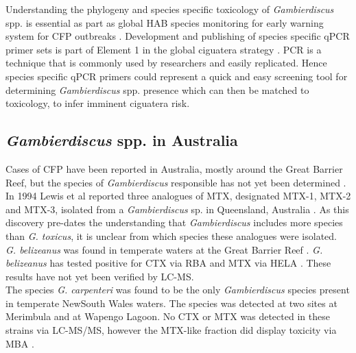 \documentclass[12pt]{article}
\begin{document}
Understanding the phylogeny and species specific toxicology of \emph{Gambierdiscus} spp. is essential as part as global HAB species monitoring for early warning system for CFP outbreaks \cite{berdalet2012global}. Development and publishing of species specific qPCR primer sets is part of Element 1 in the global ciguatera strategy \cite{globalcig}. PCR is a technique that is commonly used by researchers and easily replicated. Hence species specific qPCR primers could represent a quick and easy screening tool for determining \emph{Gambierdiscus} spp. presence which can then be matched to toxicology, to infer imminent ciguatera risk.


\subsection{\emph{Gambierdiscus} spp. in Australia}
Cases of CFP have been reported in Australia, mostly around the Great Barrier Reef, but the species of \emph{Gambierdiscus} responsible has not yet been determined \cite{lewis2006ciguatera}.\\

In 1994 Lewis et al reported three analogues of MTX, designated MTX-1, MTX-2 and MTX-3, isolated from a \emph{Gambierdiscus} sp. in Queensland, Australia \cite{holmes1994purification}. As this discovery pre-dates the understanding that \emph{Gambierdiscus} includes more species than \emph{G. toxicus}, it is unclear from which species these analogues were isolated.  \\


\emph{G. belizeanus} was found in temperate waters at the Great Barrier Reef \cite{murray2014molecular}. \emph{G. belizeanus} has tested positive for CTX via RBA \cite{chinain2010growth} and MTX via HELA \cite{holland2013differences}. These results have not yet been verified by LC-MS.\\

The species \emph{G. carpenteri} was found to be the only \emph{Gambierdiscus} species present in temperate NewSouth Wales waters. The species was detected at two sites at Merimbula and at Wapengo Lagoon. No CTX or MTX was detected in these strains via LC-MS/MS, however the MTX-like fraction did display toxicity via MBA  \cite{kohli2014high}.\\ 
\end{document}
